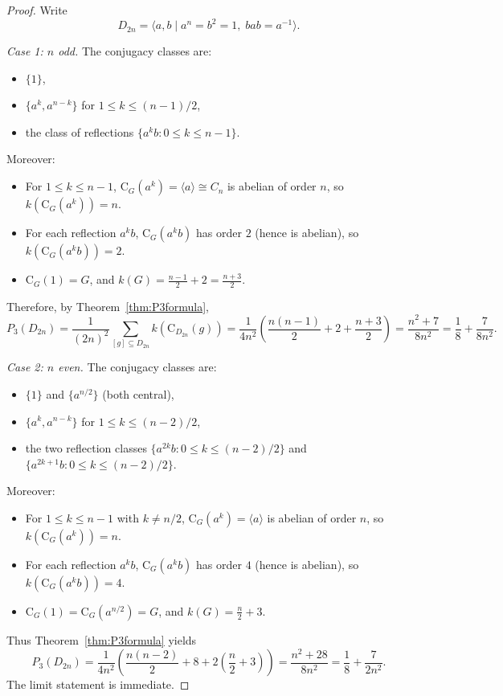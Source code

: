 \documentclass[11pt]{article}
\theoremstyle{definition}
\theoremstyle{remark}
\theoremstyle{definition}
\theoremstyle{plain}
\newcommand{\C}{\mathrm{C}}
\begin{document}
\begin{proof}
Write
\[
D_{2n}=\langle a,b \mid a^n=b^2=1,\; bab=a^{-1}\rangle.
\]

\noindent\emph{Case 1: $n$ odd.}
The conjugacy classes are:
\begin{itemize}
\item $\{1\}$,
\item $\{a^k,a^{n-k}\}$ for $1\le k\le (n-1)/2$,
\item the class of reflections $\{a^k b:0\le k\le n-1\}$.
\end{itemize}
Moreover:
\begin{itemize}
\item For $1\le k\le n-1$, $\C_G(a^k)=\langle a\rangle\cong C_n$ is abelian of order $n$, so $k(\C_G(a^k))=n$.
\item For each reflection $a^k b$, $\C_G(a^k b)$ has order $2$ (hence is abelian), so $k(\C_G(a^k b))=2$.
\item $\C_G(1)=G$, and $k(G)=\frac{n-1}{2}+2=\frac{n+3}{2}$.
\end{itemize}
Therefore, by Theorem~\ref{thm:P3formula},
\[
P_3(D_{2n})
=\frac{1}{(2n)^2}\sum_{[g]\subseteq D_{2n}} k(\C_{D_{2n}}(g))
=\frac{1}{4n^2}\left( \frac{n(n-1)}{2}+2+\frac{n+3}{2}\right)
=\frac{n^2+7}{8n^2}
=\frac18+\frac{7}{8n^2}.
\]

\noindent\emph{Case 2: $n$ even.}
The conjugacy classes are:
\begin{itemize}
\item $\{1\}$ and $\{a^{n/2}\}$ (both central),
\item $\{a^k,a^{n-k}\}$ for $1\le k\le (n-2)/2$,
\item the two reflection classes $\{a^{2k}b:0\le k\le (n-2)/2\}$ and $\{a^{2k+1}b:0\le k\le (n-2)/2\}$.
\end{itemize}
Moreover:
\begin{itemize}
\item For $1\le k\le n-1$ with $k\ne n/2$, $\C_G(a^k)=\langle a\rangle$ is abelian of order $n$, so $k(\C_G(a^k))=n$.
\item For each reflection $a^k b$, $\C_G(a^k b)$ has order $4$ (hence is abelian), so $k(\C_G(a^k b))=4$.
\item $\C_G(1)=\C_G(a^{n/2})=G$, and $k(G)=\frac{n}{2}+3$.
\end{itemize}
Thus Theorem~\ref{thm:P3formula} yields
\[
P_3(D_{2n})
=\frac{1}{4n^2}\left( \frac{n(n-2)}{2}+8+2\left(\frac{n}{2}+3\right)\right)
=\frac{n^2+28}{8n^2}
=\frac18+\frac{7}{2n^2}.
\]
The limit statement is immediate.
\end{proof}
\end{document}
